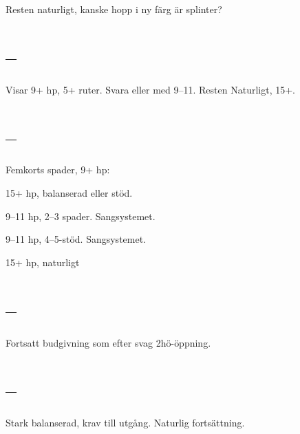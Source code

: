 Resten naturligt, kanske hopp i ny färg är splinter?

\section{ -- }

Visar 9+ hp, 5+ ruter. Svara  eller  med 9--11. Resten
Naturligt, 15+.

\section{ -- }

Femkorts spader, 9+ hp:

\bbe
\item[\hj{2}] 15+ hp, balanserad eller stöd.
\item[\spa{2}] 9--11 hp, 2--3 spader. Sangsystemet.
\item[\NT{2}, \spa{3}] 9--11 hp, 4--5-stöd. Sangsystemet.
\item[Annat] 15+ hp, naturligt
\ebe

\section{ -- }

Fortsatt budgivning som efter svag 2hö-öppning.

\section{ -- }

Stark balanserad, krav till utgång. Naturlig fortsättning.
 

